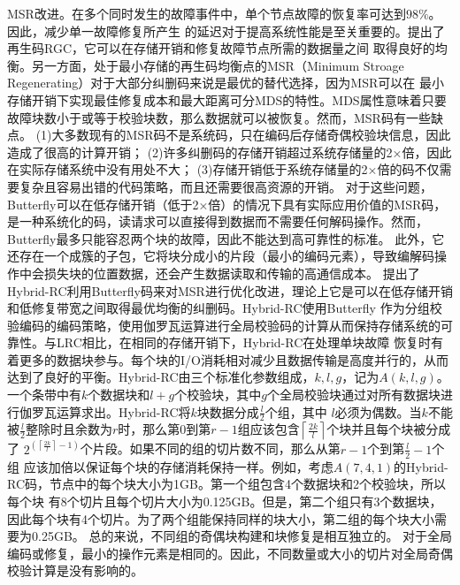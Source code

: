 MSR改进。在多个同时发生的故障事件中，单个节点故障的恢复率可达到$98\%$\cite{rashmi2014hitchhiker,xia2015tale}。因此，减少单一故障修复所产生
的延迟对于提高系统性能是至关重要的。\citet{dimakis2007benefits,dimakis2010network}提出了再生码RGC，它可以在存储开销和修复故障节点所需的数据量之间
取得良好的均衡。另一方面，处于最小存储的再生码均衡点的MSR（Minimum Stroage Regenerating）对于大部分纠删码来说是最优的替代选择，因为MSR可以在
最小存储开销下实现最佳修复成本和最大距离可分MDS的特性。MDS属性意味着只要故障块数小于或等于校验块数，那么数据就可以被恢复。然而，MSR码有一些缺点。
(1)大多数现有的MSR码不是系统码，只在编码后存储奇偶校验块信息，因此造成了很高的计算开销；
(2)许多纠删码的存储开销超过系统存储量的2×倍，因此在实际存储系统中没有用处不大；
(3)存储开销低于系统存储量的2×倍的码不仅需要复杂且容易出错的代码策略，而且还需要很高资源的开销。
对于这些问题，Butterfly\cite{pamies2016opening}可以在低存储开销（低于2×倍）的情况下具有实际应用价值的MSR码，
是一种系统化的码，读请求可以直接得到数据而不需要任何解码操作。然而，Butterfly最多只能容忍两个块的故障，因此不能达到高可靠性的标准。
此外，它还存在一个成簇的子包，它将块分成小的片段（最小的编码元素），导致编解码操作中会损失块的位置数据，还会产生数据读取和传输的高通信成本。
\citet{ye2017hybrid}提出了Hybrid-RC利用Butterfly码来对MSR进行优化改进，理论上它是可以在低存储开销和低修复带宽之间取得最优均衡的纠删码。Hybrid-RC使用Butterfly
作为分组校验编码的编码策略，使用伽罗瓦运算进行全局校验码的计算从而保持存储系统的可靠性。与LRC相比，在相同的存储开销下，Hybrid-RC在处理单块故障
恢复时有着更多的数据块参与。每个块的I/O消耗相对减少且数据传输是高度并行的，从而达到了良好的平衡。Hybrid-RC由三个标准化参数组成，$k,l,g$，记为$A(k,l,g)$。
一个条带中有$k$个数据块和$l+g$个校验块，其中$g$个全局校验块通过对所有数据块进行伽罗瓦运算求出。Hybrid-RC将$k$块数据分成$\frac{l}{2}$个组，其中
$l$必须为偶数。当$k$不能被$\frac{l}{2}$整除时且余数为$r$时，那么第0到第$r-1$组应该包含$\left\lceil\frac{2 k}{l}\right\rceil$个块并且每个块被分成了
$2^{\left(\left\lceil\frac{2 k}{l}\right\rceil-1\right)}$个片段。如果不同的组的切片数不同，那么从第$r-1$个到第$\frac{l}{2}-1$个组
应该加倍以保证每个块的存储消耗保持一样。例如，考虑$A(7,4,1)$的Hybrid-RC码，节点中的每个块大小为1GB。第一个组包含4个数据块和2个校验块，所以每个块
有8个切片且每个切片大小为0.125GB。但是，第二个组只有3个数据块，因此每个块有4个切片。为了两个组能保持同样的块大小，第二组的每个块大小需要为0.25GB。
总的来说，不同组的奇偶块构建和块修复是相互独立的。
对于全局编码或修复，最小的操作元素是相同的。因此，不同数量或大小的切片对全局奇偶校验计算是没有影响的。

